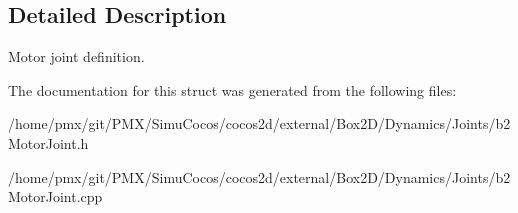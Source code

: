 \subsection{Detailed Description}
Motor joint definition. 

The documentation for this struct was generated from the following files\+:\begin{DoxyCompactItemize}
\item 
/home/pmx/git/\+P\+M\+X/\+Simu\+Cocos/cocos2d/external/\+Box2\+D/\+Dynamics/\+Joints/b2\+Motor\+Joint.\+h\item 
/home/pmx/git/\+P\+M\+X/\+Simu\+Cocos/cocos2d/external/\+Box2\+D/\+Dynamics/\+Joints/b2\+Motor\+Joint.\+cpp\end{DoxyCompactItemize}
